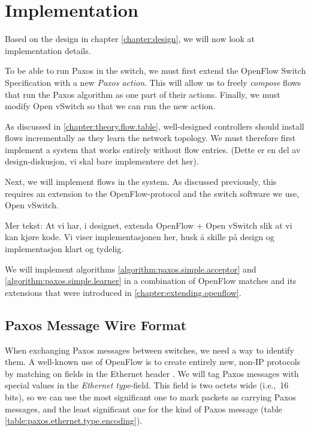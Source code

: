 \chapter{Implementation}
\label{chapter:implementation}

Based on the design in chapter \ref{chapter:design}, we will now look at
implementation details.

To be able to run Paxos in the switch, we must first extend the OpenFlow
Switch Specification with a new \textit{Paxos action}.
%
%
%
This will allow us to freely \textit{compose} flows that run the
Paxos algorithm as one part of their actions.
%
Finally, we must modify Open vSwitch so that we can run the new action.



As discussed in \vref{chapter:theory.flow.table}, well-designed controllers
should install flows incrementally as they learn the network topology.
%
We must therefore first implement a system that works entirely without flow
entries. (Dette er en del av design-diskusjon, vi skal bare implementere det
her).

Next, we will implement flows in the system. As discussed previously, this
requires an extension to the OpenFlow-protocol and the switch software we
use, Open vSwitch.

Mer tekst: At vi har, i designet, extenda OpenFlow + Open vSwitch slik at vi
kan kjøre kode. Vi viser implementasjonen her, husk å skille på design og
implementasjon klart og tydelig.

\label{implementation.simplified.paxos}

We will implement algorithms \ref{algorithm:paxos.simple.acceptor} 
and \ref{algorithm:paxos.simple.learner} in a combination of OpenFlow
matches and its extensions that were introduced
in \vref{chapter:extending.openflow}.



\section{Paxos Message Wire Format}

When exchanging Paxos messages between switches, we need a way to identify
them.
%
A well-known use of OpenFlow is to create entirely new, non-IP protocols
by matching on fields in the Ethernet header
\cite[Example 4, p.~73]{McKeown:2008:OEI:1355734.1355746}.
%
We will tag Paxos messages with special values in the \textit{Ethernet
  type}-field.
%
This field is two octets wide (i.e.,~16 bits), so we can use the most
significant one to mark packets as carrying Paxos messages, and the
least significant one for the kind of Paxos message (table
\ref{table:paxos.ethernet.type.encoding}).

